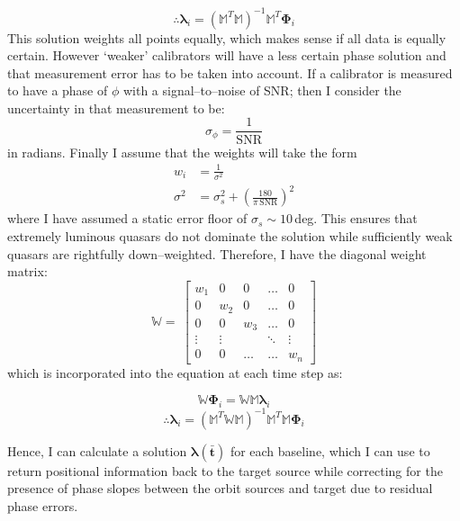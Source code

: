	\begin{equation}
	\therefore \boldsymbol{\lambda}_i = (\mathbb{M}^{T}\mathbb{M})^{-1}\mathbb{M}^{T}\boldsymbol{\Phi}_i
	\end{equation}
	This solution weights all points equally, which makes sense if all data is equally certain. However `weaker' calibrators will have a less certain phase solution and that measurement error has to be taken into account. If a calibrator is measured to have a phase of $\phi$ with a signal--to--noise of SNR; then I consider the uncertainty in that measurement to be:
	\begin{equation}
	\sigma_\phi = \frac{1}{\text{SNR}}
	\end{equation} in radians. Finally I assume that the weights will take the form
	\begin{equation}
	\begin{split}
	w_i &= \frac{1}{\sigma^2} \\
	\sigma^2&=\sigma_s^2 + \left(\frac{180}{\pi\,\text{SNR}}\right)^2
	\end{split}
	\end{equation} where I have assumed a static error floor of $\sigma_s\sim10$\,deg. This ensures that extremely luminous quasars do not dominate the solution while sufficiently weak quasars are rightfully down--weighted. Therefore, I have the diagonal weight matrix:
	\[\mathbb{W}
	=  \
			\begin{bmatrix}
			w_1 	& 0 		& 0 	& \dots     & 0\\
			0 		& w_2 		& 0     & \dots     & 0\\
			0 		& 0 		& w_3   & \dots     & 0\\
			\vdots 	& \vdots 	& 		& \ddots	& \vdots\\
			0 	    & 0 	    & \dots &\dots      & w_n
			\end{bmatrix}
	\]	which is incorporated into the equation at each time step as:
	
	\[ \mathbb{W} \boldsymbol{\Phi}_i
	= \mathbb{W} \mathbb{M} \boldsymbol{\lambda}_i
	\]
	\begin{equation}
		\therefore \boldsymbol{\lambda}_i = (\mathbb{M}^{T}\mathbb{W}\mathbb{M})^{-1}\mathbb{M}^{T}\mathbb{M}\boldsymbol{\Phi}_i
	\end{equation}
	
    Hence, I can calculate a solution $\boldsymbol{\lambda}\left(\boldsymbol{\bar{t}}\right)$ for each baseline, which I can use to return positional information back to the target source while correcting for the presence of phase slopes between the orbit sources and target due to residual phase errors.
	


